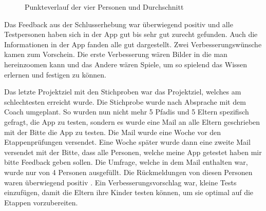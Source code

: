 \begin{figure}[ht]
    \centering
    \caption{Punkteverlauf der vier Personen und Durchschnitt}
    \label{fig:fortschritt}
\end{figure}

Das Feedback aus der Schlusserhebung war überwiegend positiv und alle Testpersonen haben sich in der App gut bis sehr gut zurecht gefunden. Auch die Informationen in der App fanden alle gut dargestellt. Zwei Verbesserungswünsche kamen zum Vorschein. Die erste Verbesserung wären Bilder in die man hereinzoomen kann und das Andere wären Spiele, um so spielend das Wissen erlernen und festigen zu können. \par
Das letzte Projektziel mit den Stichproben war das Projektziel, welches am schlechtesten erreicht wurde. Die Stichprobe wurde nach Absprache mit dem Coach umgeplant. So wurden nun nicht mehr 5 Pfadis und 5 Eltern spezifisch gefragt, die App zu testen, sondern es wurde eine Mail an alle Eltern geschrieben mit der Bitte die App zu testen. Die Mail wurde eine Woche vor den Etappenprüfungen versendet. Eine Woche später wurde dann eine zweite Mail versendet mit der Bitte, dass alle Personen, welche meine App getestet haben mir bitte Feedback geben sollen. Die Umfrage, welche in dem Mail enthalten war, wurde nur von 4 Personen ausgefüllt. Die Rückmeldungen von diesen Personen waren überwiegend positiv \cite{noauthor_feedback_nodate}. Ein Verbesserungsvorschlag war, kleine Tests einzufügen, damit die Eltern ihre Kinder testen können, um sie optimal auf die Etappen vorzubereiten.

